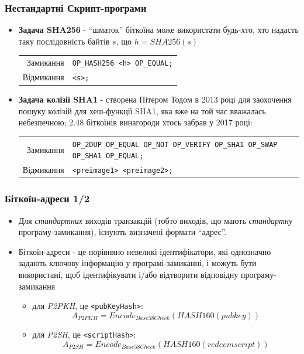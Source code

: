 \documentclass{beamer}
\begin{document}
\begin{frame}[fragile]
  \frametitle{Нестандартні Скрипт-програми}
  \begin{itemize}
  \item \textbf{Задача SHA256} - ``шматок'' біткоїна може використати будь-хто,
    хто надасть таку послідовність байтів $s$, що $h = SHA256(s)$
    \break
    \begin{tabular}{rl}
      Замикання &\tiny\texttt{OP_HASH256 <h> OP_EQUAL;} \\
      Відмикання &\tiny\texttt{<s>;} \\
    \end{tabular}
  \item \textbf{Задача колізії SHA1} - створена Пітером Тодом в 2013 році для
    заохочення пошуку колізій для хеш-функції SHA1, яка вже на той час вважалась
    небезпечною; 2.48 біткоїнів винагороди хтось забрав у 2017 році:
    \break
    \begin{tabular}{rl}
      Замикання &\tiny\texttt{OP_2DUP OP_EQUAL OP_NOT OP_VERIFY OP_SHA1 OP_SWAP OP_SHA1 OP_EQUAL;} \\
      Відмикання &\tiny\texttt{<preimage1> <preimage2>;} \\
    \end{tabular}
  \end{itemize}
\end{frame}

\begin{frame}[fragile]
  \frametitle{Біткоїн-адреси 1/2}
  \begin{itemize}
  \item Для \textit{стандартних} виходів транзакцій (тобто виходів, що мають
    \textit{стандартну} програму-замикання), існують визначені формати ``адрес''.    
  \item Біткоїн-адреси - це порівняно невеликі ідентифікатори, які однозначно
    задають ключову інформацію у програмі-замиканні, і можуть бути використані,
    щоб ідентифікувати і/або відтворити відповідну програму-замикання
    \begin{itemize}
    \item для \textit{P2PKH}, це \texttt{<pubKeyHash>}:
      $$A_{P2PKH} = Encode_{Base58Check}(HASH160(pubkey))$$
    \item для \textit{P2SH}, це \texttt{<scriptHash>}:
      $$A_{P2SH} = Encode_{Base58Check}(HASH160(redeemscript))$$
    \end{itemize}
  \end{itemize}
\end{frame}
\end{document}
